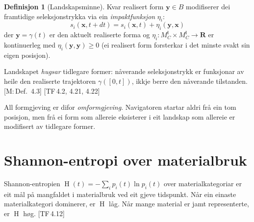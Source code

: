 \documentclass[10pt]{book}
\theoremstyle{definition}
\newtheorem{definisjon}{Definisjon}[chapter]
\theoremstyle{plain}
\theoremstyle{remark}
\newcommand{\MC}{M^{\mathsf{I}}_C}
\providecommand{\R}{}
\renewcommand{\R}{\mathbf{R}}
\DeclareMathOperator{\Ent}{H}
\newcommand{\TF}[1]{\textnormal{[TF\,#1]}}
\newcommand{\Mref}[1]{\textnormal{[M:\,#1]}}
\begin{document}
\begin{definisjon}[Landskapsminne]\label{def:minne}
Kvar realisert form $\bm{y} \in B$ modifiserer dei framtidige seleksjonstrykka via ein \emph{impaktfunksjon} $\eta_i$:
\[
  s_i(\bm{x}, t + dt) = s_i(\bm{x}, t) + \eta_i(\bm{y}, \bm{x})
\]
der $\bm{y} = \gamma(t)$ er den aktuelt realiserte forma og $\eta_i : \MC \times \MC \to \R$ er kontinuerleg med $\eta_i(\bm{y}, \bm{y}) \geq 0$ (ei realisert form forsterkar i det minste svakt sin eigen posisjon).

Landskapet \emph{hugsar} tidlegare former: n\aa verande seleksjonstrykk er funksjonar av heile den realiserte trajektoren $\gamma([0, t])$, ikkje berre den n\aa verande tilstanden. \Mref{Def.~4.3} \TF{4.2, 4.21, 4.22}
\end{definisjon}

All formgjeving er difor \emph{omformgjeving}. Navigatoren startar aldri fr\aa{} ein tom posisjon, men fr\aa{} ei form som allereie eksisterer i eit landskap som allereie er modifisert av tidlegare former.

\section{Shannon-entropi over materialbruk}\label{sec:dyn:entropi}

Shannon-entropien $\Ent(t) = -\sum_i p_i(t) \ln p_i(t)$ over materialkategoriar er eit m\aa l p\aa{} mangfaldet i materialbruk ved eit gjeve tidspunkt. N\aa r ein einaste materialkategori dominerer, er $\Ent$ l\aa g. N\aa r mange material er jamt representerte, er $\Ent$ h\o g. \TF{4.12}
\end{document}
